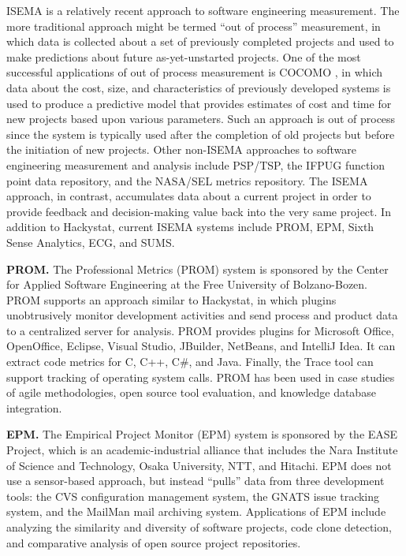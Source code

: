 \documentclass[10pt,twocolumn]{article}
\begin{document}

ISEMA is a relatively recent approach to software engineering measurement.
The more traditional approach might be termed ``out of process''
measurement, in which data is collected about a set of previously completed
projects and used to make predictions about future as-yet-unstarted
projects.  One of the most successful applications of out of process
measurement is COCOMO \cite{Boehm00}, in which data about the cost, size,
and characteristics of previously developed systems is used to produce a
predictive model that provides estimates of cost and time for new projects
based upon various parameters.  Such an approach is out of process since
the system is typically used after the completion of old projects but
before the initiation of new projects.  Other non-ISEMA approaches to
software engineering measurement and analysis include PSP/TSP, the IFPUG
function point data repository, and the NASA/SEL metrics repository. The
ISEMA approach, in contrast, accumulates data about a current project in
order to provide feedback and decision-making value back into the very same
project. In addition to Hackystat, current ISEMA systems include PROM, EPM,
Sixth Sense Analytics, ECG, and SUMS.

{\bf PROM.} The Professional Metrics (PROM) system \cite{PROM} is sponsored
by the Center for Applied Software Engineering at the Free University of
Bolzano-Bozen. PROM supports an approach similar to Hackystat, in which
plugins unobtrusively monitor development activities and send process and
product data to a centralized server for analysis.  PROM provides plugins
for Microsoft Office, OpenOffice, Eclipse, Visual Studio, JBuilder,
NetBeans, and IntelliJ Idea. It can extract code metrics for C, C++, C\#,
and Java. Finally, the Trace tool can support tracking of operating system
calls.  PROM has been used in case studies of agile methodologies, open
source tool evaluation, and knowledge database integration.

{\bf EPM.} The Empirical Project Monitor (EPM) system \cite{EPM} is
sponsored by the EASE Project, which is an academic-industrial alliance
that includes the Nara Institute of Science and Technology, Osaka
University, NTT, and Hitachi.  EPM does not use a sensor-based approach,
but instead ``pulls'' data from three development tools: the CVS
configuration management system, the GNATS issue tracking system, and the
MailMan mail archiving system. Applications of EPM include analyzing the
similarity and diversity of software projects, code clone detection, and
comparative analysis of open source project repositories.
\end{document}
